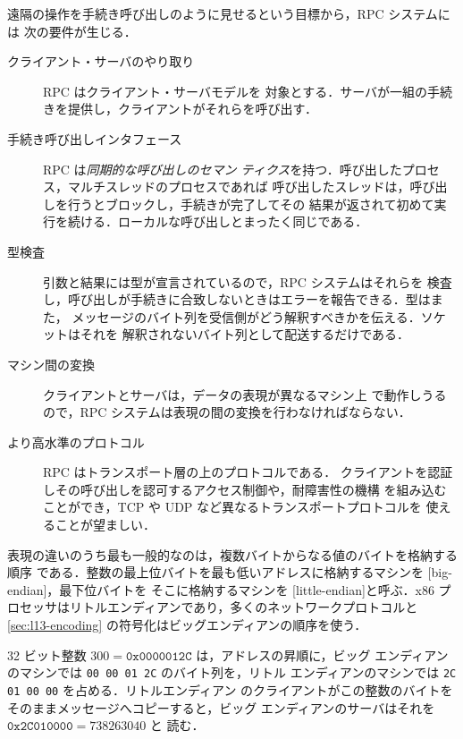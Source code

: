 \documentclass[../main.tex]{subfiles}
\begin{document}
遠隔の操作を手続き呼び出しのように見せるという目標から，RPC システムには
次の要件が生じる．
\begin{description}
  \item[クライアント・サーバのやり取り] RPC はクライアント・サーバモデルを
    対象とする．サーバが一組の手続きを提供し，クライアントがそれらを呼び出す．
  \item[手続き呼び出しインタフェース] RPC は\emph{同期的な呼び出しのセマン
    ティクス}を持つ．呼び出したプロセス，マルチスレッドのプロセスであれば
    呼び出したスレッドは，呼び出しを行うとブロックし，手続きが完了してその
    結果が返されて初めて実行を続ける．ローカルな呼び出しとまったく同じである．
  \item[型検査] 引数と結果には型が宣言されているので，RPC システムはそれらを
    検査し，呼び出しが手続きに合致しないときはエラーを報告できる．型はまた，
    メッセージのバイト列を受信側がどう解釈すべきかを伝える．ソケットはそれを
    解釈されないバイト列として配送するだけである．
  \item[マシン間の変換] クライアントとサーバは，データの表現が異なるマシン上
    で動作しうるので，RPC システムは表現の間の変換を行わなければならない．
  \item[より高水準のプロトコル] RPC はトランスポート層の上のプロトコルである．%
    クライアントを認証しその呼び出しを認可するアクセス制御や，耐障害性の機構
    を組み込むことができ，TCP や UDP など異なるトランスポートプロトコルを
    使えることが望ましい．
\end{description}

表現の違いのうち最も一般的なのは，複数バイトからなる値のバイトを格納する順序
である．整数の最上位バイトを最も低いアドレスに格納するマシンを
[big-endian]，最下位バイトを
そこに格納するマシンを
[little-endian]と呼ぶ．x86
プロセッサはリトルエンディアンであり，多くのネットワークプロトコルと
\cref{sec:l13-encoding} の符号化はビッグエンディアンの順序を使う．

\begin{example}
  \label{ex:l13-endian}
  32 ビット整数 $300 = \mathtt{0x0000012C}$ は，アドレスの昇順に，ビッグ
  エンディアンのマシンでは \texttt{00 00 01 2C} のバイト列を，リトル
  エンディアンのマシンでは \texttt{2C 01 00 00} を占める．リトルエンディアン
  のクライアントがこの整数のバイトをそのままメッセージへコピーすると，ビッグ
  エンディアンのサーバはそれを $\mathtt{0x2C010000} = \num{738263040}$ と
  読む．
\end{example}
\end{document}
